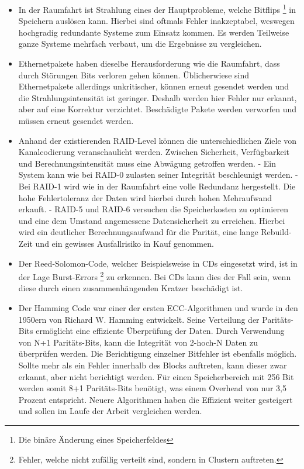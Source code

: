 \begin{itemize}
	\item In der Raumfahrt ist Strahlung eines der Hauptprobleme, welche Bitflips
		\footnote{Die binäre Änderung eines Speicherfeldes}
		in Speichern auslösen kann.
		Hierbei sind oftmals Fehler inakzeptabel, weswegen hochgradig redundante Systeme zum Einsatz kommen.
		Es werden Teilweise ganze Systeme mehrfach verbaut, um die Ergebnisse zu vergleichen.
	\item Ethernetpakete haben dieselbe Herausforderung wie die Raumfahrt, dass durch Störungen Bits verloren gehen können.
		Üblicherwiese sind Ethernetpakete allerdings unkritischer, können erneut gesendet werden und die Strahlungsintensität ist geringer.
		Deshalb werden hier Fehler nur erkannt, aber auf eine Korrektur verzichtet.
		Beschädigte Pakete werden verworfen und müssen erneut gesendet werden.
		\cite{Spec} 
	\item Anhand der existierenden RAID-Level können die unterschiedlichen Ziele von Kanalcodierung veranschaulicht werden.
		Zwischen Sicherheit, Verfügbarkeit und Berechnungsintensität muss eine Abwägung getroffen werden.
		- Ein System kann wie bei RAID-0 zulasten seiner Integrität beschleunigt werden.
		- Bei RAID-1 wird wie in der Raumfahrt eine volle Redundanz hergestellt. Die hohe Fehlertoleranz der Daten wird hierbei durch hohen Mehraufwand erkauft.
		- RAID-5 und RAID-6 versuchen die Speicherkosten zu optimieren und eine dem Umstand angemessene Datensicherheit zu erreichen. Hierbei wird ein deutlicher Berechnungsaufwand für die Parität, eine lange Rebuild-Zeit und ein gewisses Ausfallrisiko in Kauf genommen.
	\item Der Reed-Solomon-Code, welcher Beispielsweise in CDs eingesetzt wird, ist in der Lage Burst-Errors
		\footnote{Fehler, welche nicht zufällig verteilt sind, sondern in Clustern auftreten.}
		zu erkennen.
		Bei CDs kann dies der Fall sein, wenn diese durch einen zusammenhängenden Kratzer beschädigt ist.
	\item Der Hamming Code war einer der ersten ECC-Algorithmen und wurde in den 1950ern von Richard W. Hamming entwickelt.
		Seine Verteilung der Paritäts-Bits ermöglicht eine effiziente Überprüfung der Daten.
		Durch Verwendung von N+1 Paritäts-Bits, kann die Integrität von 2-hoch-N Daten zu überprüfen  werden.
		Die Berichtigung einzelner Bitfehler ist ebenfalls möglich.
		Sollte mehr als ein Fehler innerhalb des Blocks auftreten, kann dieser zwar erkannt, aber nicht berichtigt werden.
		Für einen Speicherbereich mit 256 Bit werden somit 8+1 Paritäts-Bits benötigt, was einem Overhead von nur 3,5 Prozent entspricht.
		Neuere Algorithmen haben die Effizient weiter gesteigert und sollen im Laufe der Arbeit vergleichen werden.
\end{itemize}

